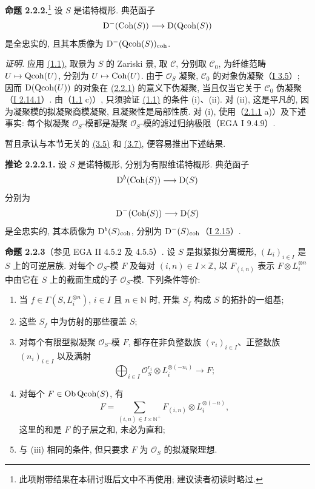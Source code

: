 \textbf{命题 2.2.2.}\footnote{此项附带结果在本研讨班后文中不再使用; 建议读者初读时略过.} 设 $S$ 是诺特概形. 典范函子
\[
\mathrm D^{-}(\operatorname{Coh}(S))\longrightarrow \mathrm D(\operatorname{Qcoh}(S))
\]
是全忠实的, 且其本质像为 $\mathrm D^{-}(\operatorname{Qcoh}(S))_{\mathrm{coh}}$.

\emph{证明.} 应用 \hyperlink{sga6.e02.prop.1-1}{(1.1)}, 取景为 $S$ 的 Zariski 景, 取 $\mathcal C$, 分别取 $\mathcal C_0$, 为纤维范畴 $U\mapsto\operatorname{Qcoh}(U)$, 分别为 $U\mapsto\operatorname{Coh}(U)$. 由于 $\mathcal O_S$ 凝聚, $\mathcal C_0$ 的对象伪凝聚（\hyperlink{sga6.e01.cor.3-5}{I 3.5}）; 因而 $\mathrm D(\operatorname{Qcoh}(U))$ 的对象在 \hyperlink{sga6.e02.notation.2-2-1}{(2.2.1)} 的意义下伪凝聚, 当且仅当它关于 $\mathcal C_0$ 伪凝聚（\hyperlink{sga6.e01.schol.2-14-1}{I 2.14.1}）. 由（\hyperlink{sga6.e02.prop.1-1}{1.1} c)）, 只须验证 \hyperlink{sga6.e02.prop.1-1}{(1.1)} 的条件 (i)、(ii). 对 (ii), 这是平凡的, 因为凝聚模的拟凝聚商模凝聚, 且凝聚性是局部性质. 对 (i), 使用（\hyperlink{sga6.e02.lem.2-1-1}{2.1.1} a)）及下述事实: 每个拟凝聚 $\mathcal O_S$-模都是凝聚 $\mathcal O_S$-模的滤过归纳极限（EGA I 9.4.9）.

暂且承认与本节无关的 \hyperlink{sga6.e02.prop.3-5}{(3.5)} 和 \hyperlink{sga6.e02.prop.3-7}{(3.7)}, 便容易推出下述结果.

\textbf{推论 2.2.2.1.} 设 $S$ 是诺特概形, 分别为有限维诺特概形. 典范函子
\[
\mathrm D^b(\operatorname{Coh}(S))\longrightarrow \mathrm D(S)
\]
分别为
\[
\mathrm D^{-}(\operatorname{Coh}(S))\longrightarrow \mathrm D(S)
\]
是全忠实的, 其本质像为 $\mathrm D^b(S)_{\mathrm{coh}}$, 分别为 $\mathrm D^{-}(S)_{\mathrm{coh}}$（\hyperlink{sga6.e01.ex.2-15}{I 2.15}）.

\textbf{命题 2.2.3}（参见 EGA II 4.5.2 及 4.5.5）. 设 $S$ 是拟紧拟分离概形, $(L_i)_{i\in I}$ 是 $S$ 上的可逆层族. 对每个 $\mathcal O_S$-模 $F$ 及每对 $(i,n)\in I\times\mathbb Z$, 以 $F_{(i,n)}$ 表示 $F\otimes L_i^{\otimes n}$ 中由它在 $S$ 上的截面生成的子 $\mathcal O_S$-模. 下列条件等价:
\begin{enumerate}[label=(\roman*)]
\item[(i)] 当 $f\in\Gamma(S,L_i^{\otimes n})$, $i\in I$ 且 $n\in\mathbb N$ 时, 开集 $S_f$ 构成 $S$ 的拓扑的一组基;
\item[(i')] 这些 $S_f$ 中为仿射的那些覆盖 $S$;
\item[(ii)] 对每个有限型拟凝聚 $\mathcal O_S$-模 $F$, 都存在非负整数族 $(r_i)_{i\in I}$、正整数族 $(n_i)_{i\in I}$ 以及满射
\[
\bigoplus_{i\in I}\mathcal O_S^{r_i}\otimes L_i^{\otimes(-n_i)}\longrightarrow F;
\]
\item[(iii)] 对每个 $F\in\operatorname{Ob}\operatorname{Qcoh}(S)$, 有
\[
F=\sum_{(i,n)\in I\times\mathbb N^{+}}F_{(i,n)}\otimes L_i^{\otimes(-n)},
\]
这里的和是 $F$ 的子层之和, 未必为直和;
\item[(iii')] 与 (iii) 相同的条件, 但只要求 $F$ 为 $\mathcal O_S$ 的拟凝聚理想.
\end{enumerate}

